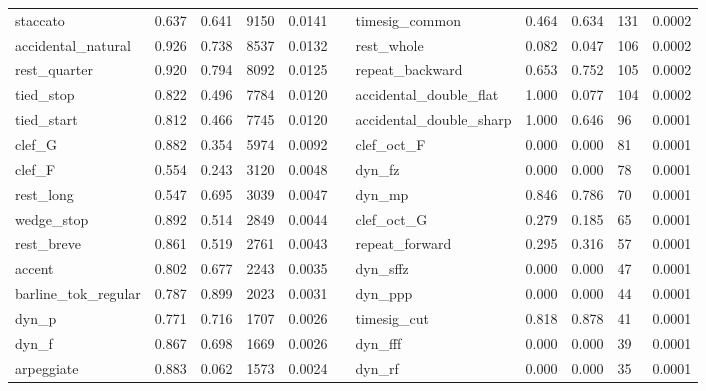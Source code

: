 \begin{table*}[ht]
\begin{adjustbox}{max width=\textwidth}
\begin{tabular}{@{}lllllllllll@{}}
staccato               & 0.637     & 0.641  & 9150   & 0.0141 &  & timesig\_common           & 0.464     & 0.634  & 131    & 0.0002 \\
accidental\_natural    & 0.926     & 0.738  & 8537   & 0.0132 &  & rest\_whole               & 0.082     & 0.047  & 106    & 0.0002 \\
rest\_quarter          & 0.920     & 0.794  & 8092   & 0.0125 &  & repeat\_backward          & 0.653     & 0.752  & 105    & 0.0002 \\
tied\_stop             & 0.822     & 0.496  & 7784   & 0.0120 &  & accidental\_double\_flat  & 1.000     & 0.077  & 104    & 0.0002 \\
tied\_start            & 0.812     & 0.466  & 7745   & 0.0120 &  & accidental\_double\_sharp & 1.000     & 0.646  & 96     & 0.0001 \\
clef\_G                & 0.882     & 0.354  & 5974   & 0.0092 &  & clef\_oct\_F              & 0.000     & 0.000  & 81     & 0.0001 \\
clef\_F                & 0.554     & 0.243  & 3120   & 0.0048 &  & dyn\_fz                   & 0.000     & 0.000  & 78     & 0.0001 \\
rest\_long             & 0.547     & 0.695  & 3039   & 0.0047 &  & dyn\_mp                   & 0.846     & 0.786  & 70     & 0.0001 \\
wedge\_stop            & 0.892     & 0.514  & 2849   & 0.0044 &  & clef\_oct\_G              & 0.279     & 0.185  & 65     & 0.0001 \\
rest\_breve            & 0.861     & 0.519  & 2761   & 0.0043 &  & repeat\_forward           & 0.295     & 0.316  & 57     & 0.0001 \\
accent                 & 0.802     & 0.677  & 2243   & 0.0035 &  & dyn\_sffz                 & 0.000     & 0.000  & 47     & 0.0001 \\
barline\_tok\_regular  & 0.787     & 0.899  & 2023   & 0.0031 &  & dyn\_ppp                  & 0.000     & 0.000  & 44     & 0.0001 \\
dyn\_p                 & 0.771     & 0.716  & 1707   & 0.0026 &  & timesig\_cut              & 0.818     & 0.878  & 41     & 0.0001 \\
dyn\_f                 & 0.867     & 0.698  & 1669   & 0.0026 &  & dyn\_fff                  & 0.000     & 0.000  & 39     & 0.0001 \\
arpeggiate             & 0.883     & 0.062  & 1573   & 0.0024 &  & dyn\_rf                   & 0.000     & 0.000  & 35     & 0.0001 \\

\end{tabular}
\end{adjustbox}
\end{table*}
